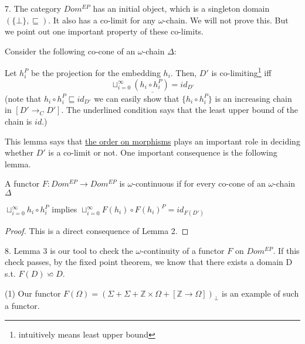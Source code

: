 \documentclass{report}[12pt]
\begin{document}
7. The category $Dom^{EP}$ has an initial object, which is a singleton domain $(\{\bot\}, \sqsubseteq)$. It also has a co-limit for any $\omega$-chain. We will not prove this. But we point out one important property of these co-limits.

\begin{lemma}
  Consider the following co-cone of an $\omega$-chain $\Delta$:
  {\center
  \par}
  Let $h_i^P$ be the projection for the embedding $h_i$. Then, $D'$ is co-limiting\footnote{intuitively means least upper bound} iff \[\underline{\sqcup_{i=0}^\infty (h_i \circ h_i^P) = id_{D'}}\]
  (note that $h_i \circ h_i^P \sqsubseteq id_{D'}$ we can easily show that $\{h_i \circ h_i^P\}$ is an increasing chain in $[D'\rightarrow_C D']$. The underlined condition says that the least upper bound of the chain is $id$.)
\end{lemma}
This lemma says that \underline{the order on morphisms} plays an important role in deciding whether $D'$ is a co-limit or not. One important consequence is the following lemma.
\begin{lemma}
  A functor $F:Dom^{EP}\rightarrow Dom^{EP}$ is $\omega$-continuous if for every co-cone of an $\omega$-chain $\Delta$
  {\center
  \par}
  $\sqcup_{i=0}^\infty h_i \circ h_i^P$ implies $\sqcup_{i=0}^\infty F(h_i) \circ F(h_i)^P = id_{F(D')}$
\end{lemma}
\begin{proof}
  This is a direct consequence of Lemma 2.
\end{proof}

8. Lemma 3 is our tool to check the $\omega$-continuity of a functor $F$ on $Dom^{EP}$. If this check passes, by the fixed point theorem, we know that there exists a domain D s.t. $F(D)\backsimeq D$.

(1) Our functor $F(\Omega) = (\Sigma + \Sigma + \mathbb{Z}\times \Omega + [\mathbb{Z}\rightarrow \Omega])_\bot$ is an example of such a functor.
\end{document}
